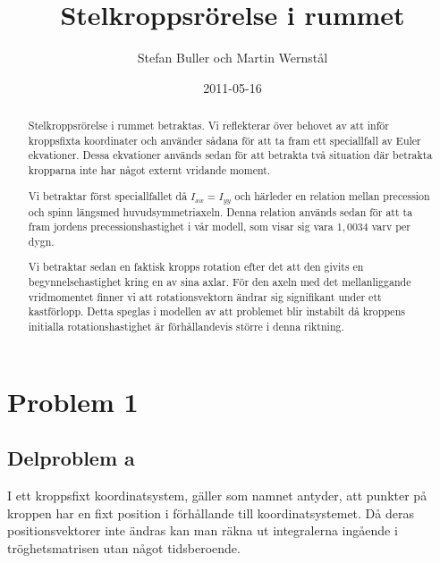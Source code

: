 \documentclass[12pt,a4paper]{article}
\begin{document}
	
\title{Stelkroppsrörelse i rummet}
	\author{Stefan Buller och Martin Wernstål}
	\date{2011-05-16}
	\maketitle{}
	\thispagestyle{empty}
	
	\begin{abstract}
		Stelkroppsrörelse i rummet betraktas. Vi reflekterar över behovet av att inför kroppsfixta 
		koordinater och använder sådana för att ta fram ett speciallfall av Euler ekvationer. Dessa 
		ekvationer används sedan för att betrakta två situation där betrakta kropparna inte har något 
		externt vridande moment. 
		
		Vi betraktar först speciallfallet då $I_{xx}=I_{yy}$ och härleder en 
		relation mellan precession och spinn längsmed huvudsymmetriaxeln. Denna relation används sedan 
		för att ta fram jordens precessionshastighet i vår modell, som visar sig vara $1,0034$ varv per dygn. 
		
		Vi betraktar sedan en faktisk kropps rotation efter det att den givits en begynnelsehastighet kring en av sina axlar.
		För den axeln med det mellanliggande vridmomentet finner vi att rotationsvektorn ändrar sig signifikant under ett 
		kastförlopp. Detta speglas i modellen av att problemet blir instabilt då kroppens initialla rotationshastighet 
		är förhållandevis större i denna riktning.
	\end{abstract}

\newpage{}

	\tableofcontents{}
	\thispagestyle{empty}

\newpage{}

	\setcounter{page}{1}
	\pagestyle{plain}
	
	
\section{Problem 1}
	\subsection{Delproblem a}
	I ett kroppsfixt koordinatsystem, gäller som namnet antyder, att punkter på kroppen
	har en fixt position i förhållande till koordinatsystemet. Då deras positionsvektorer
	inte ändras kan man räkna ut integralerna ingående i tröghetsmatrisen utan något tidsberoende.
\end{document}
